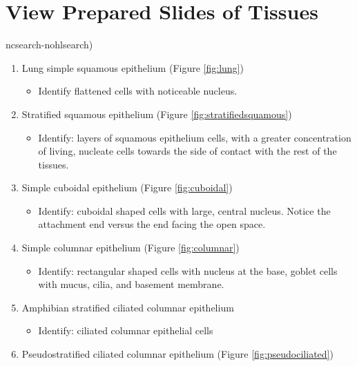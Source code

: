 \section{View Prepared Slides of
Tissues}\label{view-prepared-slides-of-tissues}

ncsearch-nohlsearch)\begin{enumerate}
\def\labelenumi{\arabic{enumi}.}
\tightlist
\item
  Lung simple squamous epithelium (Figure \ref{fig:lung})

  \begin{itemize}
  \tightlist
  \item
    Identify flattened cells with noticeable nucleus.
  \end{itemize}
\item
  Stratified squamous epithelium (Figure \ref{fig:stratifiedsquamous})

  \begin{itemize}
  \tightlist
  \item
    Identify: layers of squamous epithelium cells, with a greater
    concentration of living, nucleate cells towards the side of contact
    with the rest of the tissues.
  \end{itemize}
\item
  Simple cuboidal epithelium (Figure \ref{fig:cuboidal})

  \begin{itemize}
  \tightlist
  \item
    Identify: cuboidal shaped cells with large, central nucleus. Notice
    the attachment end versus the end facing the open space.
  \end{itemize}
\item
  Simple columnar epithelium (Figure \ref{fig:columnar})

  \begin{itemize}
  \tightlist
  \item
    Identify: rectangular shaped cells with nucleus at the base, goblet
    cells with mucus, cilia, and basement membrane.
  \end{itemize}
\item
  Amphibian stratified ciliated columnar epithelium

  \begin{itemize}
  \tightlist
  \item
    Identify: ciliated columnar epithelial cells
  \end{itemize}
\item
  Pseudostratified ciliated columnar epithelium (Figure
  \ref{fig:pseudociliated})


\end{enumerate}
